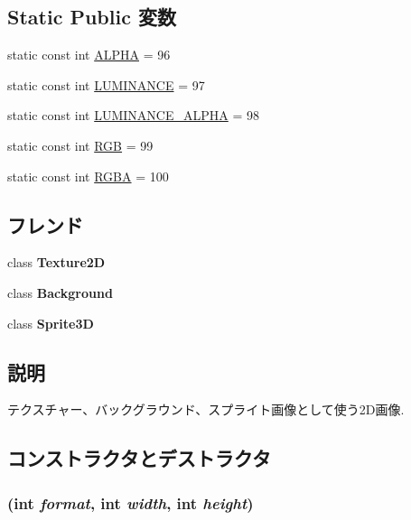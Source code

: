 \subsection*{Static Public 変数}
\begin{CompactItemize}
\item 
static const int \hyperlink{classm3g_1_1Image2D_417581fcde4067111f47320edb2aa378}{ALPHA} = 96
\item 
static const int \hyperlink{classm3g_1_1Image2D_3cf02f5117269e8ff112cbf5ecb790cd}{LUMINANCE} = 97
\item 
static const int \hyperlink{classm3g_1_1Image2D_1a74b878039f244c27120cacb4eb6a3e}{LUMINANCE\_\-ALPHA} = 98
\item 
static const int \hyperlink{classm3g_1_1Image2D_5f237f1b0f2ce6351e9e4a494b8dc759}{RGB} = 99
\item 
static const int \hyperlink{classm3g_1_1Image2D_0aaf9f2f4c064633c6d2888ec2c39e92}{RGBA} = 100
\end{CompactItemize}
\subsection*{フレンド}
\begin{CompactItemize}
\item 
\hypertarget{classm3g_1_1Image2D_a70951a0328ba29f64176f16b3ea47d8}{
class \textbf{Texture2D}}
\label{classm3g_1_1Image2D_a70951a0328ba29f64176f16b3ea47d8}

\item 
\hypertarget{classm3g_1_1Image2D_d70dac188b152e81b4323bb274bee959}{
class \textbf{Background}}
\label{classm3g_1_1Image2D_d70dac188b152e81b4323bb274bee959}

\item 
\hypertarget{classm3g_1_1Image2D_639cf38c41878a4f0fc8d24c010c96de}{
class \textbf{Sprite3D}}
\label{classm3g_1_1Image2D_639cf38c41878a4f0fc8d24c010c96de}

\end{CompactItemize}


\subsection{説明}
テクスチャー、バックグラウンド、スプライト画像として使う2D画像. 

\subsection{コンストラクタとデストラクタ}
\hypertarget{classm3g_1_1Image2D_cea21be298c6584490d2b714c4b29d6b}{
\subsubsection[{Image2D}]{ (int {\em format}, \/  int {\em width}, \/  int {\em height})}}
\label{classm3g_1_1Image2D_cea21be298c6584490d2b714c4b29d6b}


